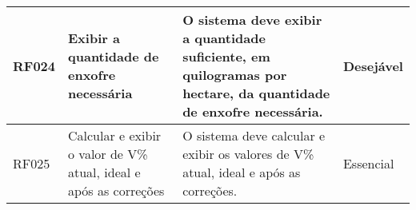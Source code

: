 \begin{table}[!htb]
\begin{tabular}{|m{1cm}|m{4cm}|m{6cm}|m{3cm}|}
        RF024 & Exibir a quantidade de enxofre necessária                                        & O sistema deve exibir a quantidade suficiente, em quilogramas por hectare, da quantidade de enxofre necessária.                                                                                                                                                                                & Desejável  \\\hline
        RF025 & Calcular e exibir o valor de V\% atual, ideal e após as correções                & O sistema deve calcular e exibir os valores de V\% atual, ideal e após as correções.                                                                                                                                                                                                           & Essencial  \\\hline
        \bottomrule
    \end{tabular}
\end{table}
